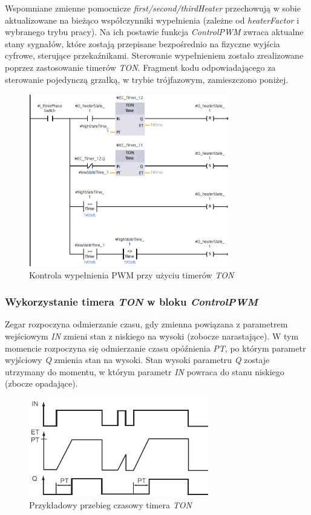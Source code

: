 \documentclass[a4paper,twoside,12pt]{book}
\begin{document}
Wspomniane zmienne pomocnicze \textit{first/second/thirdHeater} przechowują w sobie aktualizowane na bieżąco współczynniki wypełnienia (zależne od \textit{heaterFactor} i wybranego trybu pracy). Na ich postawie funkcja \textit{ControlPWM} zwraca aktualne stany sygnałów, które zostają przepisane bezpośrednio na fizyczne wyjścia cyfrowe, sterujące przekaźnikami. Sterowanie wypełnieniem zostało zrealizowane poprzez zastosowanie timerów \textit{TON}. Fragment kodu odpowiadającego za sterowanie pojedynczą grzałką, w trybie trójfazowym, zamieszczono poniżej.

\begin{figure}[h]
	\centering
	\includegraphics[width=0.78\textwidth]{./img/controlPWMcut.png}
	\caption{Kontrola wypełnienia PWM przy użyciu timerów \textit{TON}}
	\label{fig:ControlPWM cut}
\end{figure}

\newpage
\subsubsection{Wykorzystanie timera \textit{TON} w bloku \textit{ControlPWM}}
Zegar rozpoczyna odmierzanie czasu, gdy zmienna powiązana z parametrem wejściowym \textit{IN} zmieni stan z niskiego na wysoki (zobocze narastające). W tym momencie rozpoczyna się odmierzanie czasu opóźnienia \textit{PT}, po którym parametr wyjściowy \textit{Q} zmienia stan na wysoki. Stan wysoki parametru \textit{Q} zostaje utrzymany do momentu, w którym parametr \textit{IN} powraca do stanu niskiego (zbocze opadające).

\begin{figure}[h]
	\centering
	\includegraphics[width=0.7\textwidth]{./img/timerTON.png}
	\caption{Przykładowy przebieg czasowy timera \textit{TON} \cite{blogplc}}
	\label{fig:TON}
\end{figure}
\end{document}
